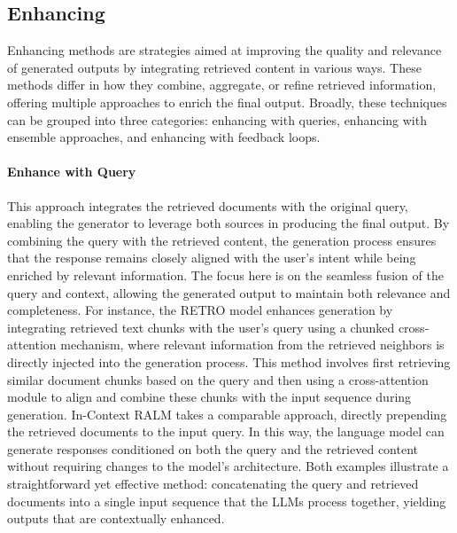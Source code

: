 \subsection{Enhancing}
Enhancing methods are strategies aimed at improving the quality and relevance of generated outputs by integrating retrieved content in various ways. These methods differ in how they combine, aggregate, or refine retrieved information, offering multiple approaches to enrich the final output. Broadly, these techniques can be grouped into three categories: enhancing with queries, enhancing with ensemble approaches, and enhancing with feedback loops.

\paragraph{Enhance with Query}
This approach integrates the retrieved documents with the original query, enabling the generator to leverage both sources in producing the final output. By combining the query with the retrieved content, the generation process ensures that the response remains closely aligned with the user’s intent while being enriched by relevant information. The focus here is on the seamless fusion of the query and context, allowing the generated output to maintain both relevance and completeness. For instance, the RETRO \cite{borgeaud2022improving} model enhances generation by integrating retrieved text chunks with the user’s query using a chunked cross-attention mechanism, where relevant information from the retrieved neighbors is directly injected into the generation process. This method involves first retrieving similar document chunks based on the query and then using a cross-attention module to align and combine these chunks with the input sequence during generation. In-Context RALM \cite{ram2023incontext} takes a comparable approach, directly prepending the retrieved documents to the input query. In this way, the language model can generate responses conditioned on both the query and the retrieved content without requiring changes to the model's architecture. Both examples illustrate a straightforward yet effective method: concatenating the query and retrieved documents into a single input sequence that the LLMs process together, yielding outputs that are contextually enhanced.

